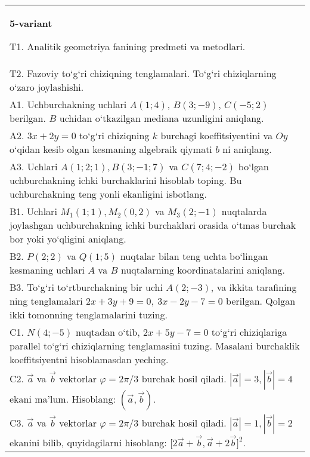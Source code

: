 \documentclass{article}
\begin{document}
\begin{tabular}{m{17cm}}
\textbf{5-variant}

T1. Analitik geometriya fanining predmeti va metodlari.
 \\
T2. 
Fazoviy to‘g‘ri chiziqning tenglamalari. To‘g‘ri chiziqlarning o‘zaro joylashishi.
 \\
A1. 
Uchburchakning uchlari $A (1;4) $, $B (3;-9) $, $C (-5;2) $
berilgan. $B$ uchidan o‘tkazilgan mediana uzunligini aniqlang.
 \\
A2. 
$3x+2y=0$ to‘g‘ri chiziqning $k$ burchagi
koeffitsiyentini va $Oy$ o‘qidan kesib olgan kesmaning algebraik
qiymati $b$ ni aniqlang.
 \\
A3. 
Uchlari $A (1;2;1), B (3;-1;7) $ va $C (7;4;-2) $ bo‘lgan uchburchakning
ichki burchaklarini hisoblab toping. Bu uchburchakning teng yonli ekanligini isbotlang.
 \\
B1. 
Uchlari \(M_{1} (1;1), M_{2} (0,2) \) va
\(M_{3} (2;-1) \) nuqtalarda joylashgan uchburchakning ichki 
burchaklari orasida o‘tmas burchak bor yoki yo‘qligini aniqlang.
 \\
B2. 
\(P (2;2) \) va \(Q (1;5) \) nuqtalar bilan teng uchta
bo‘lingan kesmaning uchlari $A$ va $B$ nuqtalarning
koordinatalarini aniqlang.
 \\
B3. 
To‘g‘ri to‘rtburchakning bir uchi \(A (2;-3) \), va ikkita tarafining
ning tenglamalari \(2x+3y+9=0,\ 3x-2y-7=0\)
berilgan. Qolgan ikki tomonning tenglamalarini tuzing.
 \\
C1. 
\(N (4;-5) \) nuqtadan o‘tib, $2x+5y-7=0$
to‘g‘ri chiziqlariga parallel to‘g‘ri chiziqlarning tenglamasini tuzing. Masalani burchaklik
koeffitsiyentni hisoblamasdan yeching.
 \\
C2. 
$\vec{a}$ va $\vec{b}$ vektorlar $\varphi = 2\pi/3$ burchak hosil qiladi. $|\vec{a}| = 3,|\vec{b}| = 4$ ekani ma’lum. Hisoblang:
$\left(\vec{a},\vec{b} \right) $.
 \\
C3. 
$\vec{a}$ va $\vec{b}$ vektorlar $\varphi = 2\pi/3$ burchak hosil qiladi. $|\vec{a}| = 1,|\vec{b}| = 2$ ekanini bilib, quyidagilarni hisoblang:
$\lbrack 2\overrightarrow{a} + \overrightarrow{b},\overrightarrow{a} + 2\overrightarrow{b}\rbrack^{2}$.
 \\

\end{tabular}
\vspace{1cm}
\end{document}
